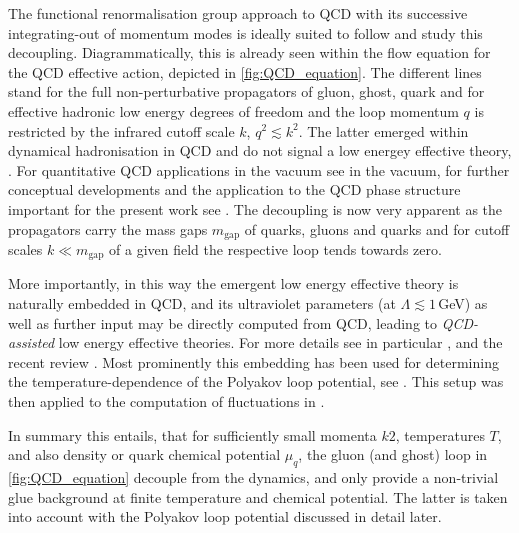 \documentclass[%
reprint,
superscriptaddress,
showpacs,preprintnumbers,
amsmath,amssymb,
aps,
prd,
]{revtex4-1}
\begin{document}
	The functional renormalisation group approach to QCD with its successive integrating-out of momentum modes is ideally suited to follow and study this decoupling. Diagrammatically, this is already seen within the flow equation for the QCD effective action, depicted in \autoref{fig:QCD_equation}. The different lines stand for the full non-perturbative propagators of gluon, ghost, quark and for effective hadronic low energy degrees of freedom and the loop momentum $q$ is restricted by the infrared cutoff scale $k$, $q^2\lesssim k^2$. The latter emerged within dynamical hadronisation in QCD and do not signal a low energey effective theory, \cite{Gies:2001nw, Gies:2002hq, Pawlowski:2005xe, Floerchinger:2009uf}. For quantitative QCD applications in the vacuum see \cite{Braun:2014ata, Rennecke:2015eba, Mitter:2014wpa, Cyrol:2017ewj} in the vacuum, for further conceptual developments and the application to the QCD phase structure important for the present work see \cite{Fu:2019hdw}. The decoupling is now very apparent as the propagators carry the mass gaps $m_\textrm{gap}$ of quarks, gluons and quarks and for cutoff scales $k\ll m_\textrm{gap}$ of a given field the respective loop tends towards zero. 
	
	More importantly, in this way the emergent low energy effective theory is naturally embedded in QCD, and its ultraviolet parameters (at $\Lambda\lesssim1$\,GeV) as well as further input may be directly computed from QCD, leading to \textit{QCD-assisted} low energy effective theories. For more details see in particular \cite{Fu:2019hdw}, and the recent review \cite{Dupuis:2020fhh}. Most prominently this embedding has been used for determining the temperature-dependence of the Polyakov loop potential, see \cite{Haas:2013qwp, Herbst:2013ufa}. This setup was then applied to the computation of fluctuations in \cite{Fu:2015amv, Fu:2015naa, Fu:2016tey,Wen:2018nkn,Yin:2019ebz}. 
	
	
	In summary this entails, that for sufficiently small momenta $k2$, temperatures $T$, and also density or quark chemical potential $\mu_q$, the gluon (and ghost) loop in \autoref{fig:QCD_equation} decouple from the dynamics, and only provide a non-trivial glue background at finite temperature and chemical potential. The latter is taken into account with the Polyakov loop potential discussed in detail later. 
	
\end{document}
